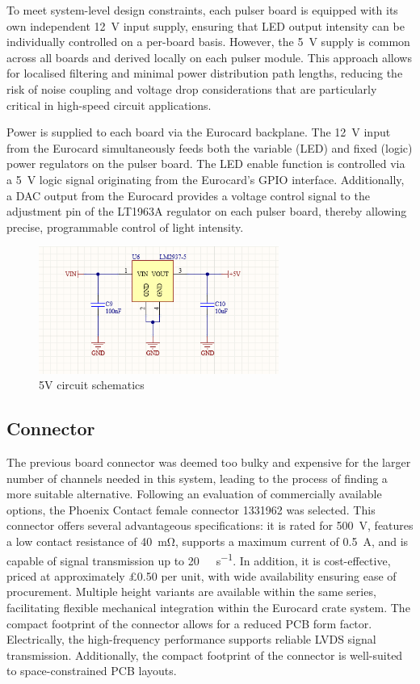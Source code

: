 \documentclass[a4paper,11pt]{article}
\begin{document}
To meet system-level design constraints, each pulser board is equipped with its own independent 12~V input supply, ensuring that LED output intensity can be individually controlled on a per-board basis. However, the 5~V supply is common across all boards and derived locally on each pulser module. This approach allows for localised filtering and minimal power distribution path lengths, reducing the risk of noise coupling and voltage drop considerations that are particularly critical in high-speed circuit applications.

Power is supplied to each board via the Eurocard backplane. The 12~V input from the Eurocard simultaneously feeds both the variable (LED) and fixed (logic) power regulators on the pulser board. The LED enable function is controlled via a 5~V logic signal originating from the Eurocard’s GPIO interface. Additionally, a DAC output from the Eurocard provides a voltage control signal to the adjustment pin of the LT1963A regulator on each pulser board, thereby allowing precise, programmable control of light intensity.


\begin{figure}[h!]
\centering
\includegraphics[width=0.7\textwidth]{5VCircuit.png}
\caption{5V circuit schematics\label{fig:5VCircuit}}
\end{figure}

\subsection{Connector}

The previous board connector was deemed too bulky and expensive for the larger number of channels needed in this system, leading to the process of finding a more suitable alternative. Following an evaluation of commercially available options, the Phoenix Contact female connector 1331962 \cite{1331962} was selected. This connector offers several advantageous specifications: it is rated for \SI{500}{\volt}, features a low contact resistance of \SI{40}{\milli\ohm}, supports a maximum current of \SI{0.5}{\ampere}, and is capable of signal transmission up to \SI{20}{\giga\bit\per\second}. In addition, it is cost-effective, priced at approximately \pounds 0.50 per unit, with wide availability ensuring ease of procurement. Multiple height variants are available within the same series, facilitating flexible mechanical integration within the Eurocard crate system. The compact footprint of the connector allows for a reduced PCB form factor. Electrically, the high-frequency performance supports reliable LVDS signal transmission. Additionally, the compact footprint of the connector is well-suited to space-constrained PCB layouts.
\end{document}
